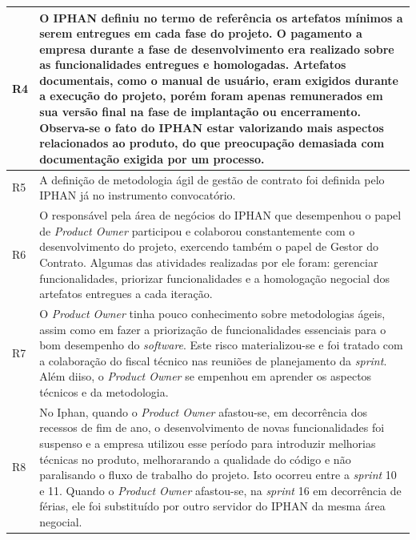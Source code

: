 \begin{longtable}{|p{2cm}|p{13cm}|}
R4                                                                &  O IPHAN definiu no termo de referência os artefatos mínimos a serem entregues em cada fase do projeto. O pagamento a empresa durante a fase de desenvolvimento era realizado sobre as funcionalidades entregues e homologadas. Artefatos documentais, como o manual de usuário, eram exigidos durante a execução do projeto, porém foram apenas remunerados em sua versão final na fase de implantação ou encerramento. Observa-se o fato do IPHAN estar valorizando mais aspectos relacionados ao produto, do que preocupação demasiada com documentação exigida por um processo.             \\ \hline
R5                                                                & A definição de metodologia ágil de gestão de contrato foi definida pelo IPHAN já no instrumento convocatório.            \\ \hline
R6                                                                & O responsável pela área de negócios do IPHAN que desempenhou o papel de \textit{Product Owner} participou e colaborou constantemente com o desenvolvimento do projeto, exercendo também o papel de Gestor do Contrato. Algumas das atividades realizadas por ele foram: gerenciar funcionalidades, priorizar funcionalidades e a homologação negocial dos artefatos entregues a cada iteração. \\ \hline
R7                                                                & O \textit{Product Owner} tinha pouco conhecimento sobre metodologias ágeis, assim como em fazer a priorização de funcionalidades essenciais para o bom desempenho do \textit{software}. Este risco materializou-se e foi tratado com a colaboração do fiscal técnico nas reuniões de planejamento da \textit{sprint}. Além diiso, o \textit{Product Owner} se empenhou em aprender os aspectos técnicos e da metodologia.               \\ \hline
R8                                                                & No Iphan, quando o \textit{Product Owner} afastou-se, em decorrência dos recessos de fim de ano, o desenvolvimento de novas funcionalidades foi suspenso e a empresa utilizou esse período para introduzir melhorias técnicas no produto, melhorarando a qualidade do código e não paralisando o fluxo de trabalho do projeto. Isto ocorreu entre a \textit{sprint} 10 e 11. Quando o  \textit{Product Owner} afastou-se, na \textit{sprint} 16 em decorrência de férias, ele foi substituído por outro servidor do IPHAN da mesma área negocial.  \\ \hline

\end{longtable}

